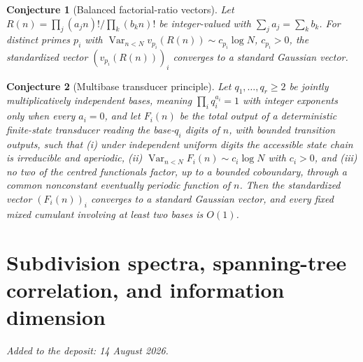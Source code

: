 \documentclass[11pt]{article}
\newtheorem{conjecture}{Conjecture}
\theoremstyle{definition}
\begin{document}
\begin{conjecture}[Balanced factorial-ratio vectors]\label{ab19}
Let $R(n)=\prod_j(a_jn)!\big/\prod_k(b_kn)!$ be integer-valued with $\sum_ja_j=\sum_kb_k$.  For distinct primes $p_i$ with $\operatorname{Var}_{n<N}v_{p_i}(R(n))\sim c_{p_i}\log N$, $c_{p_i}>0$, the standardized vector $(v_{p_i}(R(n)))_i$ converges to a standard Gaussian vector.
\end{conjecture}

\begin{conjecture}[Multibase transducer principle]\label{ab20}
Let $q_1,\ldots,q_r\ge2$ be jointly multiplicatively independent bases, meaning $\prod_iq_i^{a_i}=1$ with integer exponents only when every $a_i=0$, and let $F_i(n)$ be the total output of a deterministic finite-state transducer reading the base-$q_i$ digits of $n$, with bounded transition outputs, such that (i) under independent uniform digits the accessible state chain is irreducible and aperiodic, (ii) $\operatorname{Var}_{n<N}F_i(n)\sim c_i\log N$ with $c_i>0$, and (iii) no two of the centred functionals factor, up to a bounded coboundary, through a common nonconstant eventually periodic function of $n$.  Then the standardized vector $(F_i(n))_i$ converges to a standard Gaussian vector, and every fixed mixed cumulant involving at least two bases is $O(1)$.
\end{conjecture}

\part{Subdivision spectra, spanning-tree correlation, and information dimension}

\medskip\noindent\emph{Added to the deposit: 14 August 2026.}\par\medskip
\end{document}
